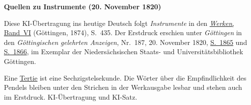 \clearpage\thispagestyle{empty}
\begin{center}\textbf{Quellen zu Instrumente (20. November 1820)}\end{center}
\noindent Diese KI-Übertragung ins heutige Deutsch folgt \textit{Instrumente} in den \href{https://gdz.sub.uni-goettingen.de/id/PPN236007467}{\textit{Werken}, Band~VI} (Göttingen, 1874), S.~435. Der Erstdruck erschien unter \textit{Göttingen} in den \textit{Göttingischen gelehrten Anzeigen}, Nr.~187, 20. November 1820, \href{https://images.p.sub.uni-goettingen.de/iiif/image/gdz:PPN319721507_1820:00001879/full/1600,/0/default.jpg}{S.~1865} und \href{https://images.p.sub.uni-goettingen.de/iiif/image/gdz:PPN319721507_1820:00001880/full/1600,/0/default.jpg}{S.~1866}, im Exemplar der Niedersächsischen Staats- und Universitätsbibliothek Göttingen.
\par\smallskip\noindent Eine \href{https://www.duden.de/rechtschreibung/Tertie}{Tertie} ist eine Sechzigstelsekunde. Die Wörter über die Empfindlichkeit des Pendels bleiben unter den Strichen in der Werkausgabe lesbar und stehen auch im Erstdruck. KI-Übertragung und KI-Satz.
\clearpage
